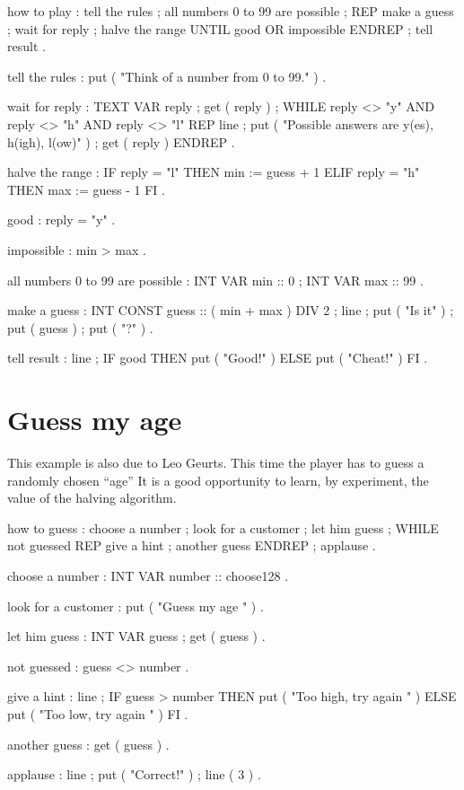 \begin{elan}
how to play :
  tell the rules ;
  all numbers 0 to 99 are possible ;
  REP
    make a guess ;
    wait for reply ;
    halve the range
  UNTIL
    good OR impossible
  ENDREP ;
  tell result .

tell the rules :
  put ( "Think of a number from 0 to 99." ) .

wait for reply :
  TEXT VAR reply ;
  get ( reply ) ;
  WHILE reply <> "y" AND reply <> "h" AND reply <> "l"
  REP
    line ;
    put ( "Possible answers are y(es), h(igh), l(ow)" ) ;
    get ( reply )
  ENDREP .

halve the range :
  IF reply = "l"
  THEN
    min := guess + 1
  ELIF reply = "h"
  THEN
    max := guess - 1
  FI .

good :
  reply = "y" .

impossible :
  min > max .

all numbers 0 to 99 are possible :
  INT VAR min :: 0 ;
  INT VAR max :: 99 .

make a guess :
  INT CONST guess :: ( min + max ) DIV 2 ;
  line ;
  put ( "Is it" ) ;
  put ( guess ) ;
  put ( "?" ) .

 tell result :
  line ;
  IF good
  THEN
    put ( "Good!" )
  ELSE
    put ( "Cheat!" )
  FI .
\end{elan}

\section{Guess my age}

This example is also due to Leo Geurts. This time the player
has to guess a randomly chosen ``age'' It is a good opportunity
to learn, by experiment, the value of the halving algorithm.

\begin{elan}
how to guess :
  choose a number ;
  look for a customer ;
  let him guess ;
  WHILE not guessed
  REP
    give a hint ;
    another guess
  ENDREP ;
  applause .

choose a number :
  INT VAR number :: choose128 .

look for a customer :
  put ( "Guess my age " ) .

let him guess :
  INT VAR guess ;
  get ( guess ) .

not guessed :
  guess <> number .

give a hint :
  line ;
  IF guess > number
  THEN
    put ( "Too high, try again " )
  ELSE
    put ( "Too low, try again  " )
  FI .

another guess :
  get ( guess ) .

applause :
  line ;
  put ( "Correct!" ) ;
  line ( 3 ) .
\end{elan}

